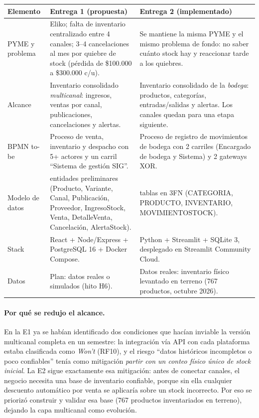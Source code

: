 \documentclass[11pt,letterpaper]{article}
\renewcommand{\_}{\oldus\allowbreak}
\begin{document}
\begin{center}
\small
\begin{tabularx}{\textwidth}{>{\raggedright\arraybackslash}p{2.6cm} >{\raggedright\arraybackslash}X >{\raggedright\arraybackslash}X}
\toprule
\textbf{Elemento} & \textbf{Entrega 1 (propuesta)} & \textbf{Entrega 2 (implementado)} \\
\midrule
PYME y problema & Eliko; falta de inventario centralizado entre 4 canales; 3–4 cancelaciones al mes por quiebre de stock (pérdida de \$100.000 a \$300.000 c/u). & Se mantiene la misma PYME y el mismo problema de fondo: no saber cuánto stock hay y reaccionar tarde a los quiebres. \\
Alcance & Inventario consolidado \emph{multicanal}: ingresos, ventas por canal, publicaciones, cancelaciones y alertas. & Inventario consolidado de la \emph{bodega}: productos, categorías, entradas/salidas y alertas. Los canales quedan para una etapa siguiente. \\
BPMN to-be & Proceso de venta, inventario y despacho con 5+ actores y un carril “Sistema de gestión SIG”. & Proceso de registro de movimientos de bodega con 2 carriles (Encargado de bodega y Sistema) y 2 gateways XOR. \\
Modelo de datos & 10 entidades preliminares (Producto, Variante, Canal, Publicación, Proveedor, IngresoStock, Venta, DetalleVenta, Cancelación, AlertaStock). & 4 tablas en 3FN (CATEGORIA, PRODUCTO, INVENTARIO, MOVIMIENTO\_STOCK). \\
Stack & React + Node/Express + PostgreSQL 16 + Docker Compose. & Python + Streamlit + SQLite 3, desplegado en Streamlit Community Cloud. \\
Datos & Plan: datos reales o simulados (hito H6). & Datos reales: inventario físico levantado en terreno (767 productos, octubre 2026). \\
\bottomrule
\end{tabularx}
\end{center}

\paragraph{Por qué se redujo el alcance.} En la E1 ya se habían identificado dos condiciones que hacían inviable la versión multicanal completa en un semestre: la integración vía API con cada plataforma estaba clasificada como \emph{Won't} (RF10), y el riesgo “datos históricos incompletos o poco confiables” tenía como mitigación \emph{partir con un conteo físico único de stock inicial}. La E2 sigue exactamente esa mitigación: antes de conectar canales, el negocio necesita una base de inventario confiable, porque sin ella cualquier descuento automático por venta se aplicaría sobre un stock incorrecto. Por eso se priorizó construir y validar esa base (767 productos inventariados en terreno), dejando la capa multicanal como evolución.
\end{document}
